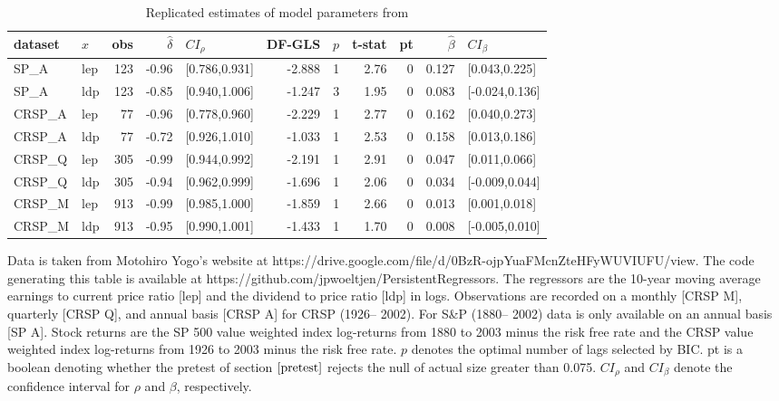 \documentclass[11pt, a4paper]{article}
\begin{document}
\begin{table}[h!]
\small
\setlength\tabcolsep{5.3pt}
\centering
\caption{Replicated estimates of model parameters from \citet{campbell2006efficient}}
\label{tab:cy_sp}
\begin{threeparttable}
\begin{tabular}{llrrlrrrrrl}
  \hline
dataset & $x$ & obs & $\hat{\delta}$ & $CI_{\rho}$ & DF-GLS & $p$ &t-stat & pt & $\hat{\beta}$ & $CI_{\beta}$ \\ 
  \hline
  SP\_A & lep & 123 & -0.96 & [0.786,0.931] & -2.888 & 1 & 2.76 & 0 & 0.127 & [0.043,0.225] \\ 
  SP\_A & ldp & 123 & -0.85 & [0.940,1.006] & -1.247 & 3 & 1.95 & 0 & 0.083 & [-0.024,0.136] \\ 
  CRSP\_A & lep & 77 & -0.96 & [0.778,0.960] & -2.229 & 1 & 2.77 & 0 & 0.162 & [0.040,0.273] \\ 
  CRSP\_A & ldp & 77 & -0.72 & [0.926,1.010] & -1.033 & 1 & 2.53 & 0 & 0.158 & [0.013,0.186] \\ 
  CRSP\_Q & lep & 305 & -0.99 & [0.944,0.992] & -2.191 & 1 & 2.91 & 0 & 0.047 & [0.011,0.066] \\ 
  CRSP\_Q & ldp & 305 & -0.94 & [0.962,0.999] & -1.696 & 1 & 2.06 & 0 & 0.034 & [-0.009,0.044] \\ 
  CRSP\_M & lep & 913 & -0.99 & [0.985,1.000] & -1.859 & 1 & 2.66 & 0 & 0.013 & [0.001,0.018] \\ 
  CRSP\_M & ldp & 913 & -0.95 & [0.990,1.001] & -1.433 & 1 & 1.70 & 0 & 0.008 & [-0.005,0.010] \\ 
\hline
\end{tabular}
 \begin{tablenotes}
 \small
\item Data is taken from Motohiro Yogo's website at https://drive.google.com/file/d/0BzR-ojpYuaFMcnZteHFyWUVIUFU/view. The code generating this table is available at https://github.com/jpwoeltjen/PersistentRegressors. The regressors are the 10-year moving average earnings to current price ratio [lep] and the dividend to price ratio [ldp] in logs. Observations are recorded on a monthly [CRSP M], quarterly [CRSP Q], and annual basis [CRSP A] for CRSP (1926– 2002). For S\&P (1880– 2002) data is only available on an annual basis [SP A]. Stock returns are the SP 500 value weighted index log-returns from 1880 to 2003 minus the risk free rate and the CRSP value weighted index log-returns from 1926 to 2003 minus the risk free rate. $p$ denotes the optimal number of lags selected by BIC. pt is a boolean denoting whether the pretest of section $\ref{pretest}$ rejects the null of actual size greater than 0.075. $CI_{\rho}$ and $CI_{\beta}$ denote the confidence interval for $\rho$ and $\beta$, respectively.
\end{tablenotes}
\end{threeparttable}
\end{table}
\end{document}
